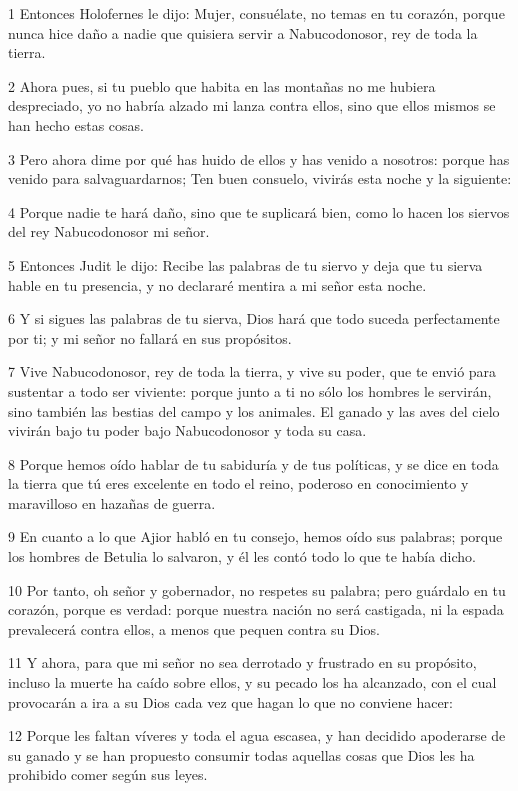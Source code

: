 \par 1 Entonces Holofernes le dijo: Mujer, consuélate, no temas en tu corazón, porque nunca hice daño a nadie que quisiera servir a Nabucodonosor, rey de toda la tierra.
\par 2 Ahora pues, si tu pueblo que habita en las montañas no me hubiera despreciado, yo no habría alzado mi lanza contra ellos, sino que ellos mismos se han hecho estas cosas.
\par 3 Pero ahora dime por qué has huido de ellos y has venido a nosotros: porque has venido para salvaguardarnos; Ten buen consuelo, vivirás esta noche y la siguiente:
\par 4 Porque nadie te hará daño, sino que te suplicará bien, como lo hacen los siervos del rey Nabucodonosor mi señor.
\par 5 Entonces Judit le dijo: Recibe las palabras de tu siervo y deja que tu sierva hable en tu presencia, y no declararé mentira a mi señor esta noche.
\par 6 Y si sigues las palabras de tu sierva, Dios hará que todo suceda perfectamente por ti; y mi señor no fallará en sus propósitos.
\par 7 Vive Nabucodonosor, rey de toda la tierra, y vive su poder, que te envió para sustentar a todo ser viviente: porque junto a ti no sólo los hombres le servirán, sino también las bestias del campo y los animales. El ganado y las aves del cielo vivirán bajo tu poder bajo Nabucodonosor y toda su casa.
\par 8 Porque hemos oído hablar de tu sabiduría y de tus políticas, y se dice en toda la tierra que tú eres excelente en todo el reino, poderoso en conocimiento y maravilloso en hazañas de guerra.
\par 9 En cuanto a lo que Ajior habló en tu consejo, hemos oído sus palabras; porque los hombres de Betulia lo salvaron, y él les contó todo lo que te había dicho.
\par 10 Por tanto, oh señor y gobernador, no respetes su palabra; pero guárdalo en tu corazón, porque es verdad: porque nuestra nación no será castigada, ni la espada prevalecerá contra ellos, a menos que pequen contra su Dios.
\par 11 Y ahora, para que mi señor no sea derrotado y frustrado en su propósito, incluso la muerte ha caído sobre ellos, y su pecado los ha alcanzado, con el cual provocarán a ira a su Dios cada vez que hagan lo que no conviene hacer:
\par 12 Porque les faltan víveres y toda el agua escasea, y han decidido apoderarse de su ganado y se han propuesto consumir todas aquellas cosas que Dios les ha prohibido comer según sus leyes.
